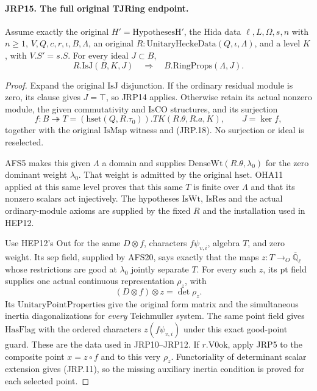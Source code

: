 \documentclass[11pt,a4paper]{article}
\numberwithin{equation}{section}
\theoremstyle{remark}\newtheorem{remark}[theorem]{Remark}
\begin{document}
\paragraph{JRP15. The full original TJRing endpoint.}
\label{claim:JRP15}
\leavevmode\par
Assume exactly the original \(H'=\mathrm{HypothesesH'}\),
the Hida data \(\ell,L,\Omega,s,n\) with \(n\ge1\),
\(V,Q,c,r,\iota,B,\Lambda\), an original
\(R:\mathrm{UnitaryHeckeData}(Q,\iota,\Lambda)\), and a
level \(K\), with \(V.S'=s.S\).  For every ideal
\(J\subset B\),
\[
             R.\mathrm{IsJ}(B,K,J)
                    \quad\Longrightarrow\quad
             B.\mathrm{RingProps}(\Lambda,J).
 \tag{JRP.19}
\]
\begin{proof}
Expand the original \(\mathrm{IsJ}\) disjunction.  If the
ordinary residual module is zero, its clause gives \(J=\top\),
so JRP14 applies.  Otherwise retain its actual nonzero module,
the given commutativity and \(\mathrm{IsCO}\) structures, and
its surjection
\[
 f:B\twoheadrightarrow
 T=(\mathrm{hset}(Q,R.\tau_0)).TK(R.\theta,R.a,K),
 \qquad J=\ker f,
 \tag{JRP.20}
\]
together with the original \(\mathrm{IsMap}\) witness and
(JRP.18).  No surjection or ideal is reselected.

AFS5 makes this given \(\Lambda\) a domain and supplies
\(\mathrm{DenseWt}(R.\theta,\lambda_0)\) for the zero
dominant weight \(\lambda_0\).  That weight is admitted by
the original \(\mathrm{hset}\).  OHA11 applied at this same
level proves that this same \(T\) is finite over \(\Lambda\)
and that its nonzero scalars act injectively.  The hypotheses
\(\mathrm{IsWt}\), \(\mathrm{IsRes}\) and the actual
ordinary-module axioms are supplied by the fixed \(R\) and
the installation used in HEP12.

Use HEP12's \(\mathrm{Out}\) for the same \(D\otimes f\),
characters \(f\psi_{v,i}\), algebra \(T\), and zero weight.
Its \(\mathrm{sep}\) field, supplied by AFS20, says exactly
that the maps \(z:T\to_O\overline{\mathbb Q}_\ell\) whose
restrictions are good at \(\lambda_0\) jointly separate \(T\).
For every such \(z\), its \(\mathrm{pt}\) field supplies
one actual continuous representation \(\rho_z\), with
\[
 (D\otimes f)\otimes z=\det\rho_z.
\]
Its \(\mathrm{UnitaryPointProperties}\) give the original
form matrix and the simultaneous inertia diagonalizations for
\emph{every} Teichmuller system.  The same point field gives
\(\mathrm{HasFlag}\) with the ordered characters
\(z(f\psi_{v,i})\) under this exact good-point guard.
These are the data used in JRP10--JRP12.  If
\(r.\mathrm{V0ok}\), apply JRP5 to the composite point
\(x=z\circ f\) and to this very \(\rho_z\).  Functoriality
of determinant scalar extension gives (JRP.11), so the missing
auxiliary inertia condition is proved for each selected point.


\end{proof}
\end{document}

